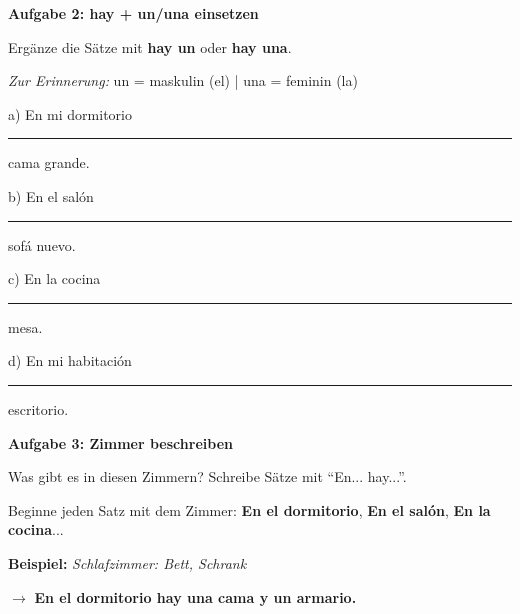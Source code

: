 \documentclass[11pt, a4paper]{article}
\newcommand{\fachfarbe}{spanisch}
\newcommand{\punktebox}[1]{\hfill\fbox{\small \_/#1}}
\newcommand{\luecke}[1]{\rule{#1}{0.4pt}}
\newenvironment{aufgabe}[1]{%
    \needspace{5\baselineskip}%
    \nopagebreak[4]%
    \vspace{10pt}
    \noindent\textbf{\textcolor{\fachfarbe}{Aufgabe #1}}
    \nopagebreak[4]%
    \vspace{5pt}
    \nopagebreak[4]%
    \begin{list}{}{\leftmargin=0pt}
    \item[]
}{%
    \end{list}
}
\newcommand{\es}[1]{\textcolor{\fachfarbe}{\textbf{#1}}}
\begin{document}
\vspace{15pt}


\begin{aufgabe}{2: hay + un/una einsetzen}
Ergänze die Sätze mit \es{hay un} oder \es{hay una}. \punktebox{4}
\end{aufgabe}

\begin{vokabelkasten}
\textit{Zur Erinnerung:} un = maskulin (el) | una = feminin (la)
\end{vokabelkasten}

\vspace{0.5em}

\noindent
a) En mi dormitorio \luecke{3cm} cama grande.

\vspace{0.6em}
\noindent
b) En el salón \luecke{3cm} sofá nuevo.

\vspace{0.6em}
\noindent
c) En la cocina \luecke{3cm} mesa.

\vspace{0.6em}
\noindent
d) En mi habitación \luecke{3cm} escritorio.

\vspace{15pt}


\begin{aufgabe}{3: Zimmer beschreiben}
Was gibt es in diesen Zimmern? Schreibe Sätze mit ``En... hay...''. \punktebox{6}
\end{aufgabe}

\begin{hinweis}
Beginne jeden Satz mit dem Zimmer: \es{En el dormitorio}, \es{En el salón}, \es{En la cocina}...
\end{hinweis}

\vspace{0.8em}

\noindent
\textbf{Beispiel:} \textit{Schlafzimmer: Bett, Schrank}

$\rightarrow$ \es{En el dormitorio hay una cama y un armario.}

\vspace{1em}
\end{document}
